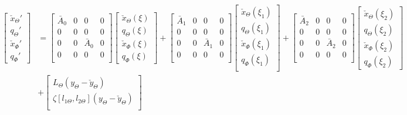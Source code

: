 \documentclass[../main.tex]{subfiles}
\begin{document}
\begin{align}
\begin{bmatrix}
\check{x}_\Theta' \\
q_\Theta' \\
\check{x}_\Phi'\\
q_\Phi'
\end{bmatrix} &=
\begin{bmatrix}
\bar{A}_0 & 0 & 0 & 0\\
0 & 0 & 0 & 0\\
0 & 0 & \bar{A}_0 & 0 \\
0 & 0 & 0 & 0 \\
\end{bmatrix}
\begin{bmatrix}
\check{x}_\Theta(\xi) \\
q_\Theta(\xi) \\
\check{x}_\Phi(\xi) \\
q_\Phi (\xi)
\end{bmatrix} + 
\begin{bmatrix}
\bar{A}_1 & 0 & 0 & 0\\
0 & 0 & 0 & 0\\
0 & 0 & \bar{A}_1 & 0 \\
0 & 0 & 0 & 0 \\
\end{bmatrix}
\begin{bmatrix}
\check{x}_\Theta(\xi_1) \\
q_\Theta(\xi_1) \\
\check{x}_\Phi(\xi_1) \\
q_\Phi(\xi_1) \\
\end{bmatrix} +
\begin{bmatrix}
\bar{A}_2 & 0 & 0 & 0\\
0 & 0 & 0 & 0\\
0 & 0 & \bar{A}_2 & 0 \\
0 & 0 & 0 & 0 \\
\end{bmatrix}
\begin{bmatrix}
\check{x}_\Theta(\xi_2) \\
q_\Theta(\xi_2) \\
\check{x}_\Phi(\xi_2) \\
q_\Phi(\xi_2) 
\end{bmatrix} \nonumber\\
&+
\begin{bmatrix}
L_\Theta(y_{\Theta} - \check{y}_{\Theta})\\
\zeta[l_{1\Theta},l_{2\Theta}](y_\Theta - \check{y}_\Theta) \\

\end{bmatrix}
\end{align}
\end{document}
